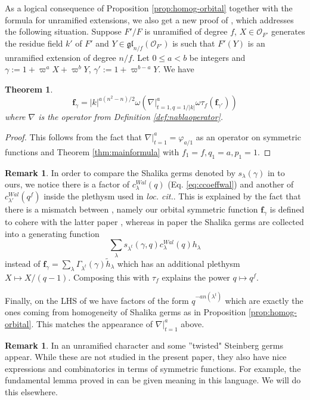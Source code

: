 \documentclass{amsart}
\numberwithin{equation}{section}
\newtheorem{theorem}[lemma]{Theorem}%
\theoremstyle{definition}
\newtheorem{remark}[lemma]{Remark}%
\def\tilde{\widetilde}
\renewcommand{\th}{\tilde{h}}
\newcommand{\fgamma}{\mathbf{f}_{\gamma}}
\newcommand{\cO}{\mathcal{O}}
\begin{document}
As a logical consequence of Proposition \ref{prop:homog-orbital} together with the formula for unramified extensions, we also get a new proof of \cite[Th\'eor\`eme 1.3.]{W1}, which addresses the following situation. Suppose $F'/F$ is unramified of degree $f$, $X\in \cO_{F'}$ generates the residue field $k'$ of $F'$ and $Y\in\mathfrak{gl}_{n/f}(\cO_{F'})$ is such that $F'(Y)$ is an unramified extension of degree $n/f$. Let $0\le a<b$ be integers and $\gamma:=1+\varpi^aX+\varpi^bY$, $\gamma':=1+\varpi^{b-a}Y$. We have

\begin{theorem}
\label{thm:unramified}
$$\fgamma=|k|^{a(n^2-n)/2}\omega (\nabla|^{a}_{t=1,q=1/|k|}\omega\tau_f(\mathbf{f}_{\gamma'}))$$
where $\nabla$ is the operator from Definition \ref{def:nablaoperator}.
\end{theorem}
\begin{proof}
This follows from the fact that $\nabla|_{t=1}^a=\varphi_{a/1}$ as an operator on symmetric functions and Theorem \ref{thm:mainformula} with $f_1=f, q_1=a, p_1=1$. 
\end{proof}
\begin{remark}
In order to compare the Shalika germs denoted by $s_\lambda(\gamma)$ in \cite{W1} to ours, we notice there is a factor of $c^{Wal}_\lambda(q)$ (Eq. \eqref{eq:ccoeffwal}) and another of 
$c_{\lambda'}^{Wal}(q^f)$ inside the plethysm used in {\em loc. cit.}. This is explained by the fact that there is a mismatch between \cite{W1,W2}, namely our orbital symmetric function $\fgamma$ 
is defined to cohere with the latter paper \cite{W2}, 
whereas in \cite{W1} paper the Shalika germs are collected into a generating function 
$$\sum_\lambda s_{\lambda^t}(\gamma,q)c^{Wal}_\lambda(q) h_\lambda$$ instead of $\fgamma=\sum_\lambda \Gamma_{\lambda^t}(\gamma) \th_\lambda$ which has an additional plethysm $X\mapsto X/(q-1)$. Composing this with $\tau_f$ explains the power $q\mapsto q^f$.

Finally, on the LHS of \cite[Th\'eor\`eme 1.3.]{W1} we have factors of the form $q^{-an(\lambda^t)}$ which are exactly the ones coming from homogeneity of Shalika germs as in Proposition \ref{prop:homog-orbital}. This matches the appearance of $\nabla|_{t=1}^a$ above.
\end{remark}
\begin{remark}
In \cite{W2} an unramified character and some ''twisted" Steinberg germs appear. While these are not studied in the present paper, they also have nice expressions and combinatorics in terms of symmetric functions. For example, the fundamental lemma proved in \cite{W2} can be given meaning in this language. We will do this elsewhere.
\end{remark}
\end{document}
